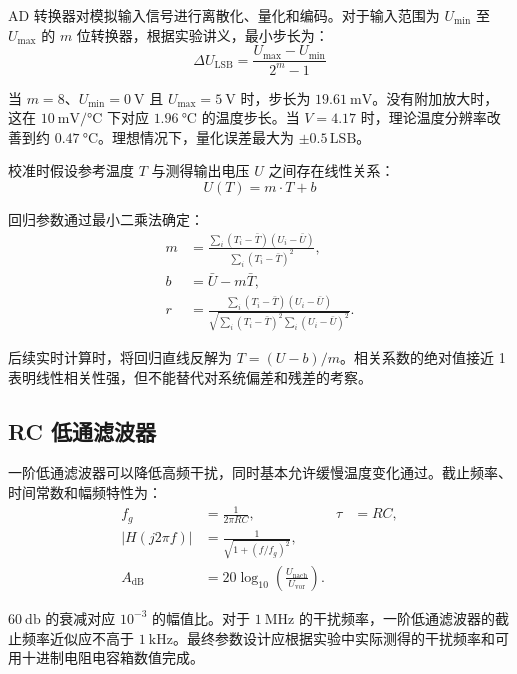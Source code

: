 AD 转换器对模拟输入信号进行离散化、量化和编码。对于输入范围为 $U_{\min}$ 至 $U_{\max}$ 的 $m$ 位转换器，根据实验讲义，最小步长为：
\begin{equation}
  \Delta U_{\mathrm{LSB}} = \frac{U_{\max} - U_{\min}}{2^m - 1}
\end{equation}

当 $m = 8$、$U_{\min} = \SI{0}{\volt}$ 且 $U_{\max} = \SI{5}{\volt}$ 时，步长为 $\SI{19.61}{\milli\volt}$。没有附加放大时，这在 $\SI{10}{\milli\volt\per\celsius}$ 下对应 $\SI{1.96}{\celsius}$ 的温度步长。当 $V = 4.17$ 时，理论温度分辨率改善到约 $\SI{0.47}{\celsius}$。理想情况下，量化误差最大为 $\pm 0.5\,\mathrm{LSB}$。

校准时假设参考温度 $T$ 与测得输出电压 $U$ 之间存在线性关系：
\begin{equation}
  U(T) = m \cdot T + b
\end{equation}

回归参数通过最小二乘法确定：
\begin{align}
  m &= \frac{\sum_i (T_i - \bar{T})(U_i - \bar{U})}{\sum_i (T_i - \bar{T})^2}, \\
  b &= \bar{U} - m \bar{T}, \\
  r &= \frac{\sum_i (T_i - \bar{T})(U_i - \bar{U})}{\sqrt{\sum_i (T_i - \bar{T})^2 \sum_i (U_i - \bar{U})^2}}.
\end{align}

后续实时计算时，将回归直线反解为 $T = (U - b)/m$。相关系数的绝对值接近 1 表明线性相关性强，但不能替代对系统偏差和残差的考察。

\subsection{RC 低通滤波器}

一阶低通滤波器可以降低高频干扰，同时基本允许缓慢温度变化通过。截止频率、时间常数和幅频特性为：
\begin{align}
  f_g &= \frac{1}{2\pi RC}, &
  \tau &= RC, \\
  \left|H(j2\pi f)\right| &= \frac{1}{\sqrt{1 + (f/f_g)^2}}, \\
  A_{\mathrm{dB}} &= 20 \log_{10}\left(\frac{U_{\mathrm{nach}}}{U_{\mathrm{vor}}}\right).
\end{align}

$\SI{60}{\decibel}$ 的衰减对应 $10^{-3}$ 的幅值比。对于 $\SI{1}{\mega\hertz}$ 的干扰频率，一阶低通滤波器的截止频率近似应不高于 $\SI{1}{\kilo\hertz}$。最终参数设计应根据实验中实际测得的干扰频率和可用十进制电阻电容箱数值完成。
